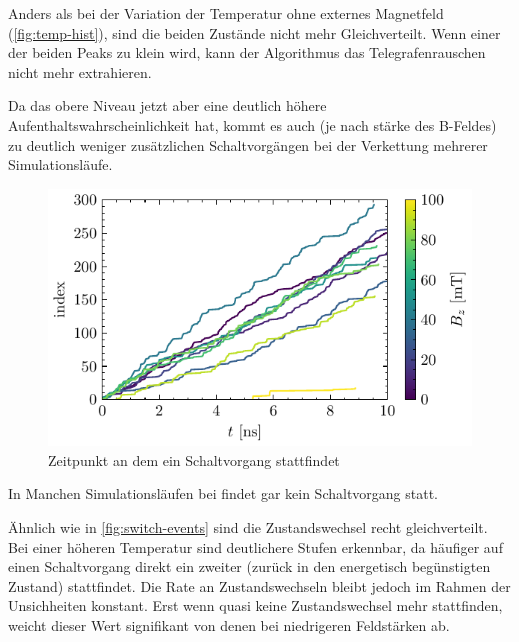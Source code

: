\documentclass[main.tex]{subfiles}
\begin{document}
Anders als bei der Variation der Temperatur ohne externes Magnetfeld (\cref{fig:temp-hist}), sind die beiden Zustände nicht mehr Gleichverteilt. Wenn einer der beiden Peaks zu klein wird, kann der Algorithmus das Telegrafenrauschen nicht mehr extrahieren. 

Da das obere Niveau jetzt aber eine deutlich höhere Aufenthaltswahrscheinlichkeit hat, kommt es auch (je nach stärke des B-Feldes) zu deutlich weniger zusätzlichen Schaltvorgängen bei der Verkettung mehrerer Simulationsläufe.


\begin{figure}[H]
    \centering
    \includegraphics{bilder/plots/max_Bz/switch_events.pdf}
    \caption{Zeitpunkt an dem ein Schaltvorgang stattfindet}\label{fig:bc-switch-events}   
\end{figure}


In Manchen Simulationsläufen bei  findet gar kein Schaltvorgang statt. 


Ähnlich wie in \cref{fig:switch-events} sind die Zustandswechsel recht gleichverteilt. Bei einer höheren Temperatur sind deutlichere Stufen erkennbar, da häufiger auf einen Schaltvorgang direkt ein zweiter (zurück in den energetisch begünstigten Zustand) stattfindet. Die Rate an Zustandswechseln bleibt jedoch im Rahmen der Unsichheiten konstant. Erst wenn quasi keine Zustandswechsel mehr stattfinden, weicht dieser Wert signifikant von denen bei niedrigeren Feldstärken ab. 
\end{document}
